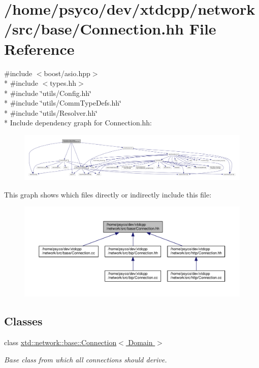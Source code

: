 \hypertarget{base_2Connection_8hh}{}\section{/home/psyco/dev/xtdcpp/network/src/base/\+Connection.hh File Reference}
\label{base_2Connection_8hh}
{\ttfamily \#include $<$boost/asio.\+hpp$>$}\\*
{\ttfamily \#include $<$types.\+hh$>$}\\*
{\ttfamily \#include \char`\"{}utils/\+Config.\+hh\char`\"{}}\\*
{\ttfamily \#include \char`\"{}utils/\+Comm\+Type\+Defs.\+hh\char`\"{}}\\*
{\ttfamily \#include \char`\"{}utils/\+Resolver.\+hh\char`\"{}}\\*
Include dependency graph for Connection.\+hh\+:
\nopagebreak
\begin{figure}[H]
\begin{center}
\leavevmode
\includegraphics[width=350pt]{base_2Connection_8hh__incl}
\end{center}
\end{figure}
This graph shows which files directly or indirectly include this file\+:
\nopagebreak
\begin{figure}[H]
\begin{center}
\leavevmode
\includegraphics[width=350pt]{base_2Connection_8hh__dep__incl}
\end{center}
\end{figure}
\subsection*{Classes}
\begin{DoxyCompactItemize}
\item 
class \hyperlink{classxtd_1_1network_1_1base_1_1Connection}{xtd\+::network\+::base\+::\+Connection$<$ Domain $>$}
\begin{DoxyCompactList}\small\item\em Base class from which all connections should derive. \end{DoxyCompactList}\end{DoxyCompactItemize}
